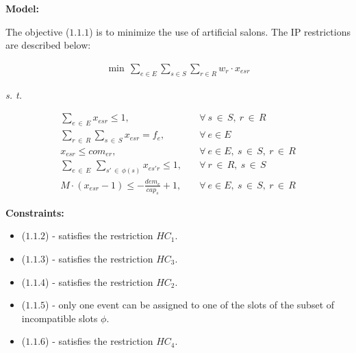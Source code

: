 \documentclass[centering]{report}
\newenvironment{slide}
    {\newpage
    \vspace*{\fill}
    }
    { 
     \vspace*{\fill}
    }
\begin{document}
\begin{slide}
\textbf{Model:}\\

{\LARGE
The objective ($1.1.1$) is to minimize the use of artificial salons. The IP restrictions are described below:

  \begin{align}
    \label{eq:fo} \min \, \sum_{e \in E} \sum_{s \in S} \sum_{r \in R} w_{r} \cdot x_{esr}
  \end{align}
}
\emph{s. t.}

{\LARGE
  \begin{align}
    \label{eq:H1} \sum_{e\,\in\,E}{x_{esr}} \le 1, & \quad \forall \ s\,\in\,S, \ r\,\in \,R \\
    \label{eq:H2} \sum_{r\,\in\,R}{\sum_{s\,\in\,S}{x_{esr}} = f_e}, & \quad \forall \ e\in E \\
    \label{eq:H3} x_{esr}  \le com_{er}, & \quad \forall \ e\in E, \ s\,\in \,S , \ r\,\in \,R \\
    \label{eq:H4} \sum_{e\,\in\,E}{\, \sum_{s'\,\in\,\phi(s)}{x_{es'r}}}  \le 1, & \quad \forall \ r\,\in \,R ,  \ s\,\in \,S \\
    \label{eq:H5} M \cdot ( x_{esr} -1 ) \le -\frac{dem_e}{cap_s} + 1, & \quad \forall \ e\in E, \ s\,\in \,S , \ r\,\in \,R
  \end{align}
}

\end{slide}

\begin{slide}
\textbf{Constraints:}\\

\begin{itemize}
\item ($1.1.2$) - satisfies the restriction $HC_1$.
\item ($1.1.3$) - satisfies the restriction $HC_3$.
\item ($1.1.4$) - satisfies the restriction $HC_2$.
\item ($1.1.5$) - only one event can be assigned to one of the slots of the subset of incompatible slots $\phi$.
\item ($1.1.6$) - satisfies the restriction $HC_4$.
\end{itemize}

\end{slide}
\end{document}
